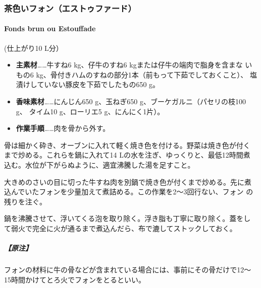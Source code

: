 \begin{recette}
\hypertarget{fondsbrun}{%
\subsubsection{茶色いフォン（エストゥファード）}\label{fondsbrun}}

\hypertarget{fonds-brun}{%
\paragraph{Fonds brun ou Estouffade}\label{fonds-brun}}


(仕上がり10 L分）

\begin{itemize}
\item
  \textbf{主素材}\ldots{}\ldots{}牛すね6
  kg、仔牛のすね6 kgまたは仔牛の端肉で脂身を含まな いもの6
  kg、骨付きハムのすねの部分1本（前もって下茹でしておくこと）、
  塩漬けしていない豚皮を下茹でしたもの650 g。
\item
  \textbf{香味素材}\ldots{}\ldots{}にんじん650 g、玉ねぎ650
  g、ブーケガルニ（パセリの枝100 g、 タイム10 g、ローリエ5
  g、にんにく1片）。
\item
  \textbf{作業手順}\ldots{}\ldots{}肉を骨から外す。
\end{itemize}

骨は細かく砕き、オーブンに入れて軽く焼き色を付ける。野菜は焼き色が付く
まで炒める。これらを鍋に入れて14 Lの水を注ぎ、ゆっくりと、最低12時間煮
込む。水位が下がらぬように、適宜沸騰した湯を足すこと。

大きめのさいの目に切った牛すね肉を別鍋で焼き色が付くまで炒める。先に煮
込んでいたフォンを少量加えて煮詰める。この作業を2〜3回行ない、フォン
の残りを注ぐ。

鍋を沸騰させて、浮いてくる泡を取り除く。浮き脂も丁寧に取り除く。蓋をし
て弱火で完全に火が通るまで煮込んだら、布で漉してストックしておく。

\hypertarget{nota-fonds-brun}{%
\subparagraph{【原注】}\label{nota-fonds-brun}}

フォンの材料に牛の骨などが含まれている場合には、事前にその骨だけで12〜
15時間かけてとろ火でフォンをとるといい。


\end{recette}
